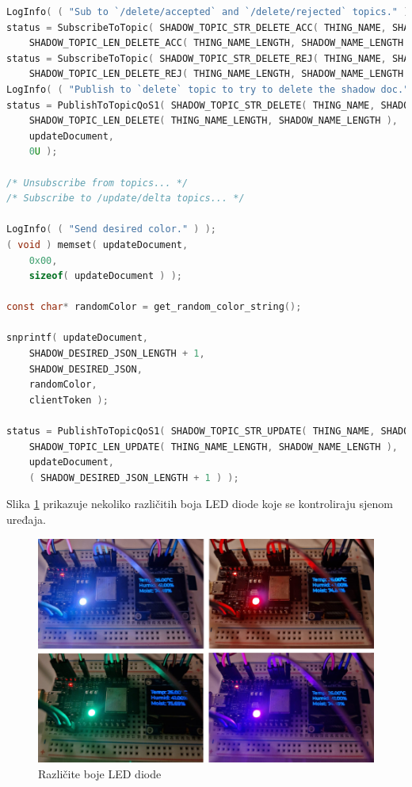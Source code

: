\begin{lstlisting}[caption={Proces ažuriranja sjene uređaja}, language=c]
LogInfo( ( "Sub to `/delete/accepted` and `/delete/rejected` topics." ) );
status = SubscribeToTopic( SHADOW_TOPIC_STR_DELETE_ACC( THING_NAME, SHADOW_NAME ),
	SHADOW_TOPIC_LEN_DELETE_ACC( THING_NAME_LENGTH, SHADOW_NAME_LENGTH ) );
status = SubscribeToTopic( SHADOW_TOPIC_STR_DELETE_REJ( THING_NAME, SHADOW_NAME ),
	SHADOW_TOPIC_LEN_DELETE_REJ( THING_NAME_LENGTH, SHADOW_NAME_LENGTH ) );
LogInfo( ( "Publish to `delete` topic to try to delete the shadow doc." ) );
status = PublishToTopicQoS1( SHADOW_TOPIC_STR_DELETE( THING_NAME, SHADOW_NAME ), 
	SHADOW_TOPIC_LEN_DELETE( THING_NAME_LENGTH, SHADOW_NAME_LENGTH ),
	updateDocument,
	0U );
			
/* Unsubscribe from topics... */
/* Subscribe to /update/delta topics... */

LogInfo( ( "Send desired color." ) );
( void ) memset( updateDocument,
	0x00,
	sizeof( updateDocument ) );

const char* randomColor = get_random_color_string();

snprintf( updateDocument,
	SHADOW_DESIRED_JSON_LENGTH + 1,
	SHADOW_DESIRED_JSON,
	randomColor,
	clientToken );

status = PublishToTopicQoS1( SHADOW_TOPIC_STR_UPDATE( THING_NAME, SHADOW_NAME ),
	SHADOW_TOPIC_LEN_UPDATE( THING_NAME_LENGTH, SHADOW_NAME_LENGTH ),
	updateDocument,
	( SHADOW_DESIRED_JSON_LENGTH + 1 ) );
\end{lstlisting}

Slika \ref{fig:rgb_lights} prikazuje nekoliko različitih boja LED diode koje se kontroliraju sjenom uređaja. 

\begin{figure}[ht]
	\centering
	\includegraphics[scale=0.5]{imgs/rgb_lights}
	\caption{Različite boje LED diode}
	\label{fig:rgb_lights}
\end{figure}

